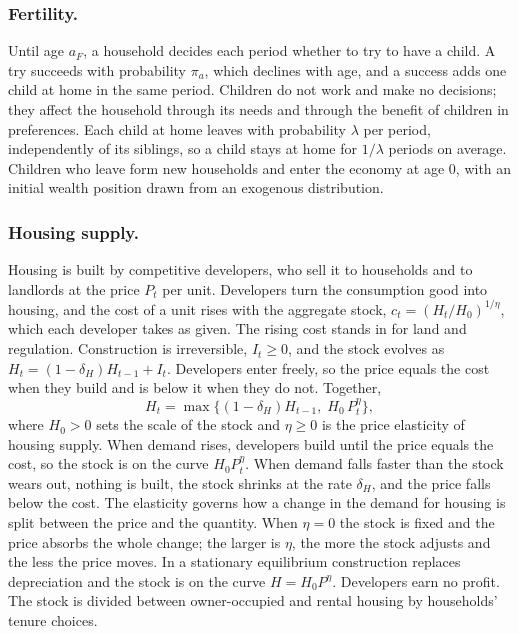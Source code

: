 \subsubsection*{Fertility.}
Until age $a_F$, a household decides each period whether to try to have a
child. A try succeeds with probability $\pi_a$, which declines with age, and a
success adds one child at home in the same period. Children do not work and
make no decisions; they affect the household through its needs and through
the benefit of children in preferences. Each child at home leaves with
probability $\lambda$ per period, independently of its siblings, so a child
stays at home for $1/\lambda$ periods on average. Children who leave form new
households and enter the economy at age $0$, with an initial wealth position
drawn from an exogenous distribution.

\subsubsection*{Housing supply.}
Housing is built by competitive developers, who sell it to households and to
landlords at the price $P_t$ per unit. Developers turn the consumption good
into housing, and the cost of a unit rises with the aggregate stock,
$c_t=(H_t/H_0)^{1/\eta}$, which each developer takes as given. The rising cost
stands in for land and regulation. Construction is irreversible, $I_t\ge0$,
and the stock evolves as $H_t=(1-\delta_H)H_{t-1}+I_t$. Developers enter
freely, so the price equals the cost when they build and is below it when they
do not. Together,
\begin{equation}
 H_t=\max\bigl\{(1-\delta_H)H_{t-1},\;H_0\,P_t^{\eta}\bigr\},
 \label{eq:m-supply}
\end{equation}
where $H_0>0$ sets the scale of the stock and $\eta\ge0$ is the price
elasticity of housing supply. When demand rises, developers build until the
price equals the cost, so the stock is on the curve $H_0P_t^{\eta}$. When
demand falls faster than the stock wears out, nothing is built, the stock
shrinks at the rate $\delta_H$, and the price falls below the cost. The
elasticity governs how a change in the demand for housing is split between
the price and the quantity. When $\eta=0$ the stock is fixed and the price
absorbs the whole change; the larger is $\eta$, the more the stock adjusts and
the less the price moves. In a stationary equilibrium construction replaces
depreciation and the stock is on the curve $H=H_0P^{\eta}$. Developers earn no
profit. The stock is divided between owner-occupied and rental housing by
households' tenure choices.

